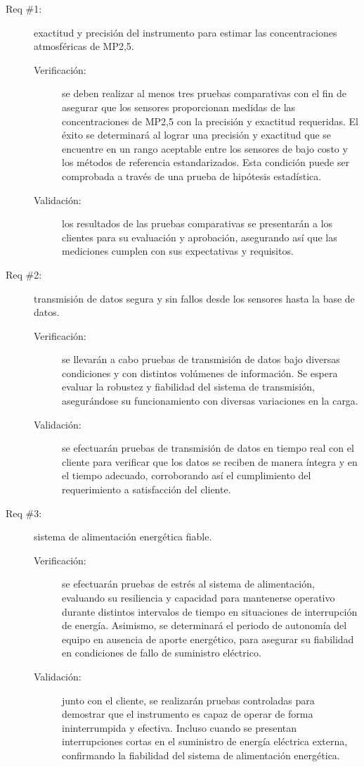 \begin{description}
	
	\item [Req \#1:] exactitud y precisión del instrumento para estimar las concentraciones atmosféricas de MP2,5.
	
	\begin{description}
		\item [Verificación:] se deben realizar al menos tres pruebas comparativas con el fin de asegurar que los sensores proporcionan medidas de las concentraciones de MP2,5 con la precisión y exactitud requeridas. El éxito se determinará al lograr una precisión y exactitud que se encuentre en un rango aceptable entre los sensores de bajo costo y los métodos de referencia estandarizados. Esta condición puede ser comprobada a través de una prueba de hipótesis estadística.
		\item [Validación:] los resultados de las pruebas comparativas se presentarán a los clientes para su evaluación y aprobación, asegurando así que las mediciones cumplen con sus expectativas y requisitos.
	\end{description}
	
	
	\item [Req \#2:] transmisión de datos segura y sin fallos desde los sensores hasta la base de datos.
	
	\begin{description}
		\item [Verificación:] se llevarán a cabo pruebas de transmisión de datos bajo diversas condiciones y con distintos volúmenes de información. Se espera evaluar la robustez y fiabilidad del sistema de transmisión, asegurándose su funcionamiento con diversas variaciones en la carga.
		\item [Validación:] se efectuarán pruebas de transmisión de datos en tiempo real con el cliente para verificar que los datos se reciben de manera íntegra y en el tiempo adecuado, corroborando así el cumplimiento del requerimiento a satisfacción del cliente.
	\end{description}
	
	
	\item [Req \#3:] sistema de alimentación energética fiable.
	
	\begin{description}
		\item [Verificación:] se efectuarán pruebas de estrés al sistema de alimentación, evaluando su resiliencia y capacidad para mantenerse operativo durante distintos intervalos de tiempo en situaciones de interrupción de energía. Asimismo, se determinará el periodo de autonomía del equipo en ausencia de aporte energético, para asegurar su fiabilidad en condiciones de fallo de suministro eléctrico.
		\item [Validación:] junto con el cliente, se realizarán pruebas controladas para demostrar que el instrumento es capaz de operar de forma ininterrumpida y efectiva. Incluso cuando se presentan interrupciones cortas en el suministro de energía eléctrica externa, confirmando la fiabilidad del sistema de alimentación energética.
	\end{description}
	

\end{description}
